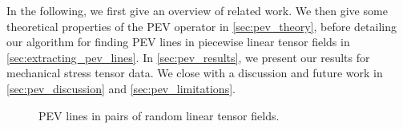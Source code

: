 %
In the following, we first give an overview of related work.
%
We then give some theoretical properties of the \ac{PEV} operator in
\cref{sec:pev_theory}, before detailing our algorithm for finding \ac{PEV} lines
in piecewise linear tensor fields in \cref{sec:extracting_pev_lines}.
%
In \cref{sec:pev_results}, we present our results for mechanical stress tensor
data.
%
We close with a discussion and future work in \cref{sec:pev_discussion} and
\cref{sec:pev_limitations}.
%
\begin{figure}[t]
    \centering
    
    \caption{\ac{PEV} lines in pairs of random linear tensor fields.}
    \label{fig:rand_lines}
\end{figure}
%
%
